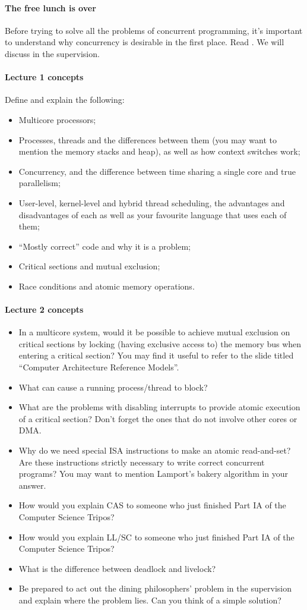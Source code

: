 \documentclass[12pt,a4paper,oneside,openright]{report}
\newcommand{\question}[2]{\paragraph{#1} #2}
\begin{document}
\question{The free lunch is over}{Before trying to solve all the
  problems of concurrent programming, it's important to understand why
  concurrency is desirable in the first place. Read
  \cite{FreeLunchIsOver}. We will discuss in the supervision.}

\question{Lecture 1 concepts}{Define and explain the following:
  \begin{itemize}
  \item Multicore processors;
  \item Processes, threads and the differences between them (you may
    want to mention the memory stacks and heap), as well as how
    context switches work;
  \item Concurrency, and the difference between time sharing a single
    core and true parallelism;
  \item User-level, kernel-level and hybrid thread scheduling, the
    advantages and disadvantages of each as well as your favourite
    language that uses each of them;
  \item ``Mostly correct'' code and why it is a problem;
  \item Critical sections and mutual exclusion;
  \item Race conditions and atomic memory operations.
  \end{itemize}
}

\question{Lecture 2 concepts}{
  \begin{itemize}
  \item In a multicore system, would it be possible to achieve mutual
    exclusion on critical sections by locking (having exclusive access
    to) the memory bus when entering a critical section? You may find
    it useful to refer to the slide titled ``Computer Architecture
    Reference Models''.
  \item What can cause a running process/thread to block?
  \item What are the problems with disabling interrupts to provide
    atomic execution of a critical section? Don't forget the ones that
    do not involve other cores or DMA.
  \item Why do we need special ISA instructions to make an atomic
    read-and-set? Are these instructions strictly necessary to write
    correct concurrent programs? You may want to mention Lamport's
    bakery algorithm in your answer.
  \item How would you explain CAS to someone who just finished Part IA
    of the Computer Science Tripos?
  \item How would you explain LL/SC to someone who just finished Part
    IA of the Computer Science Tripos?
  \item What is the difference between deadlock and livelock?
  \item Be prepared to act out the dining philosophers' problem in the
    supervision and explain where the problem lies. Can you think of a
    simple solution?
  \end{itemize}
}
\end{document}
